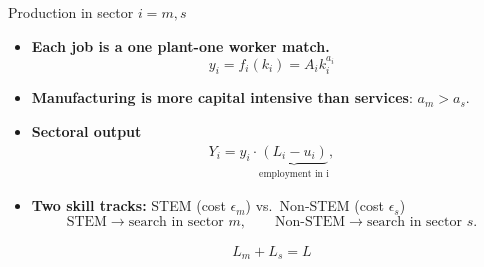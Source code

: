 \documentclass[9pt,xcolor={svgnames}]{beamer}
\begin{document}



    
    



\begin{frame}{Production in sector $i=m,s$}
  \begin{itemize}
    \item \textbf{Each job is a one plant-one worker match.} %
      \[
        y_i  =  f_i(k_i)  =A_i k_i^{a_i}
      \]
    
      \medskip
      \item \textbf{Manufacturing is more capital intensive than services}: $a_m > a_s$.
    
    
    \medskip
    \item \textbf{Sectoral output}
      \begin{align*}
       Y_i = y_i \cdot  \underbrace{(L_i-u_i)}_{\text{employment in i}},
      \end{align*}
    \medskip

   \item \textbf{Two skill tracks:} STEM (cost $\epsilon_m$) vs.\ Non‐STEM (cost $\epsilon_s$) 
      \[
        \text{STEM} \to \text{search in sector }m ,\quad \quad 
        \text{Non‐STEM} \to \text{search in sector }s.
      \]

 \begin{align*}
     L_m+L_s=L
 \end{align*}

 
  \end{itemize}
\end{frame}
\end{document}
